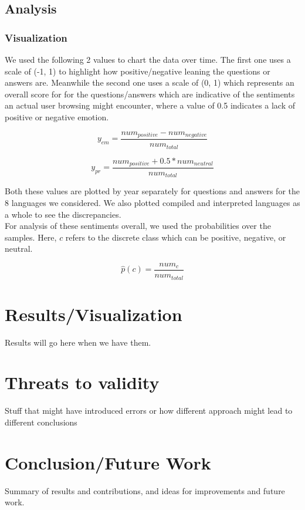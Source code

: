 \documentclass[conference]{IEEEtran}
\begin{document}
\subsection{Analysis}
\subsubsection{Visualization}
We used the following 2 values to chart the data over time. The first one uses a scale of (-1, 1) to highlight how positive/negative leaning the questions or answers are. Meanwhile the second one uses a scale of (0, 1) which represents an overall score for for the questions/answers which are indicative of the sentiments an actual user browsing might encounter, where a value of 0.5 indicates a lack of positive or negative emotion.

\begin{equation}
    y_{em} = \frac{num_{positive} - num_{negative}}{num_{total}}
\end{equation}

\begin{equation}
    y_{pr} = \frac{num_{positive} + 0.5*num_{neutral}}{num_{total}}
\end{equation}

Both these values are plotted by year separately for questions and answers for the 8 languages we considered. We also plotted compiled and interpreted languages as a whole to see the discrepancies.\\

For analysis of these sentiments overall, we used the probabilities over the samples. Here, $c$ refers to the discrete class which can be positive, negative, or neutral.

\begin{equation}
    \hat{p}(c) = \frac{num_c}{num_{total}}
\end{equation}

\section{Results/Visualization}
Results will go here when we have them.

\section{Threats to validity}
Stuff that might have introduced errors or how different approach might lead to different conclusions

\section{Conclusion/Future Work}
Summary of results and contributions, and ideas for improvements and future work.\\
\end{document}
